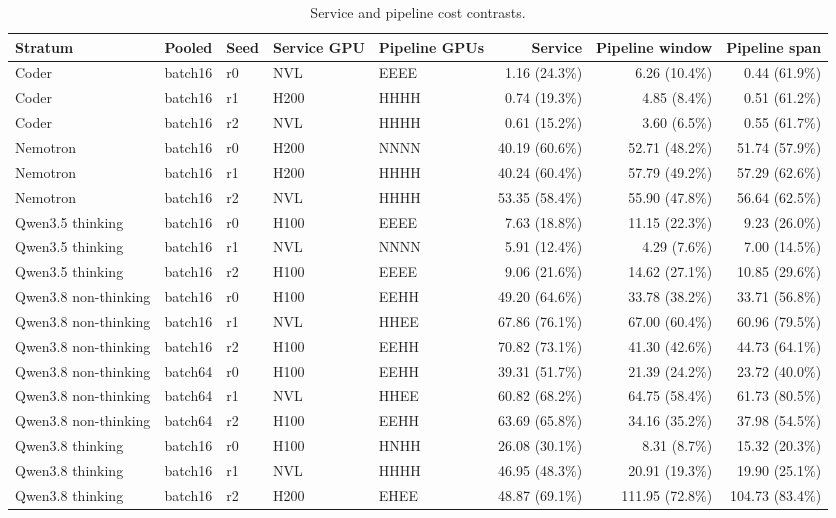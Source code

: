 
\begin{table}[t]
\caption{Service and pipeline cost contrasts.}
\label{tab:service}
\centering\small\setlength{\tabcolsep}{3pt}
\begin{tabular}{lllllrrr}
\toprule
Stratum & Pooled & Seed & Service GPU & Pipeline GPUs & Service & Pipeline window & Pipeline span \\
\midrule
Coder & batch16 & r0 & NVL & EEEE & 1.16 (24.3\%) & 6.26 (10.4\%) & 0.44 (61.9\%) \\
Coder & batch16 & r1 & H200 & HHHH & 0.74 (19.3\%) & 4.85 (8.4\%) & 0.51 (61.2\%) \\
Coder & batch16 & r2 & NVL & HHHH & 0.61 (15.2\%) & 3.60 (6.5\%) & 0.55 (61.7\%) \\
Nemotron & batch16 & r0 & H200 & NNNN & 40.19 (60.6\%) & 52.71 (48.2\%) & 51.74 (57.9\%) \\
Nemotron & batch16 & r1 & H200 & HHHH & 40.24 (60.4\%) & 57.79 (49.2\%) & 57.29 (62.6\%) \\
Nemotron & batch16 & r2 & NVL & HHHH & 53.35 (58.4\%) & 55.90 (47.8\%) & 56.64 (62.5\%) \\
Qwen3.5 thinking & batch16 & r0 & H100 & EEEE & 7.63 (18.8\%) & 11.15 (22.3\%) & 9.23 (26.0\%) \\
Qwen3.5 thinking & batch16 & r1 & NVL & NNNN & 5.91 (12.4\%) & 4.29 (7.6\%) & 7.00 (14.5\%) \\
Qwen3.5 thinking & batch16 & r2 & H100 & EEEE & 9.06 (21.6\%) & 14.62 (27.1\%) & 10.85 (29.6\%) \\
Qwen3.8 non-thinking & batch16 & r0 & H100 & EEHH & 49.20 (64.6\%) & 33.78 (38.2\%) & 33.71 (56.8\%) \\
Qwen3.8 non-thinking & batch16 & r1 & NVL & HHEE & 67.86 (76.1\%) & 67.00 (60.4\%) & 60.96 (79.5\%) \\
Qwen3.8 non-thinking & batch16 & r2 & H100 & EEHH & 70.82 (73.1\%) & 41.30 (42.6\%) & 44.73 (64.1\%) \\
Qwen3.8 non-thinking & batch64 & r0 & H100 & EEHH & 39.31 (51.7\%) & 21.39 (24.2\%) & 23.72 (40.0\%) \\
Qwen3.8 non-thinking & batch64 & r1 & NVL & HHEE & 60.82 (68.2\%) & 64.75 (58.4\%) & 61.73 (80.5\%) \\
Qwen3.8 non-thinking & batch64 & r2 & H100 & EEHH & 63.69 (65.8\%) & 34.16 (35.2\%) & 37.98 (54.5\%) \\
Qwen3.8 thinking & batch16 & r0 & H100 & HNHH & 26.08 (30.1\%) & 8.31 (8.7\%) & 15.32 (20.3\%) \\
Qwen3.8 thinking & batch16 & r1 & NVL & HHHH & 46.95 (48.3\%) & 20.91 (19.3\%) & 19.90 (25.1\%) \\
Qwen3.8 thinking & batch16 & r2 & H200 & EHEE & 48.87 (69.1\%) & 111.95 (72.8\%) & 104.73 (83.4\%) \\
\bottomrule
\end{tabular}
\end{table}
